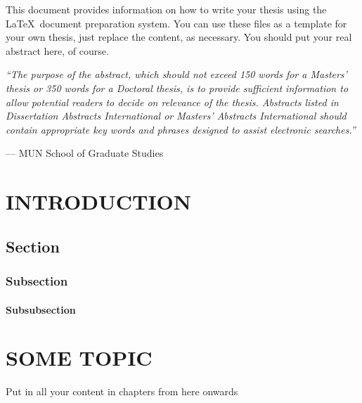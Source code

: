 \documentclass[english,a4paper,11pt]{report}
\begin{document}
	\doublespacing
	\hspace*{0.25cm}
	
	This document provides information on how to write your thesis using
	the \LaTeX\ document preparation system.  You can use these files as a
	template for your own thesis, just replace the content, as necessary.
	You should put your real abstract here, of course.
	
	\vspace{1cm}
	
	\emph{``The purpose of the abstract, which should not exceed 150 words for
		a Masters' thesis or 350 words for a Doctoral thesis, is to provide
		sufficient information to allow potential readers to decide on relevance
		of the thesis. Abstracts listed in Dissertation Abstracts International
		or Masters' Abstracts International should contain appropriate key
		words and phrases designed to assist electronic searches.''}
	
	\hfill --- MUN School of Graduate Studies
	
	\newpage
	
	\chapter{\MakeUppercase{Introduction}}
	\section{Section}
	\subsection{Subsection}
	\subsubsection{Subsubsection}

	
	\chapter{\MakeUppercase{Some Topic}}

	Put in all your content in chapters from here onwards
\end{document}
